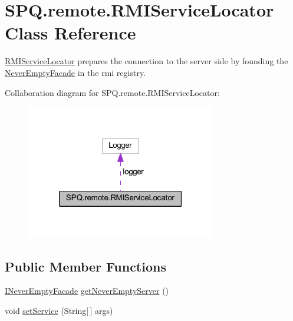 \hypertarget{class_s_p_q_1_1remote_1_1_r_m_i_service_locator}{}\section{S\+P\+Q.\+remote.\+R\+M\+I\+Service\+Locator Class Reference}
\label{class_s_p_q_1_1remote_1_1_r_m_i_service_locator}


\mbox{\hyperlink{class_s_p_q_1_1remote_1_1_r_m_i_service_locator}{R\+M\+I\+Service\+Locator}} prepares the connection to the server side by founding the \mbox{\hyperlink{class_s_p_q_1_1remote_1_1_never_empty_facade}{Never\+Empty\+Facade}} in the rmi registry.  




Collaboration diagram for S\+P\+Q.\+remote.\+R\+M\+I\+Service\+Locator\+:\nopagebreak
\begin{figure}[H]
\begin{center}
\leavevmode
\includegraphics[width=235pt]{class_s_p_q_1_1remote_1_1_r_m_i_service_locator__coll__graph}
\end{center}
\end{figure}
\subsection*{Public Member Functions}
\begin{DoxyCompactItemize}
\item 
\mbox{\hyperlink{interface_s_p_q_1_1remote_1_1_i_never_empty_facade}{I\+Never\+Empty\+Facade}} \mbox{\hyperlink{class_s_p_q_1_1remote_1_1_r_m_i_service_locator_a19d79d8b31c278a127bf921895d889ae}{get\+Never\+Empty\+Server}} ()
\item 
void \mbox{\hyperlink{class_s_p_q_1_1remote_1_1_r_m_i_service_locator_ae4d529073f4b435fa3d0fedcaad0fc70}{set\+Service}} (String\mbox{[}$\,$\mbox{]} args)
\end{DoxyCompactItemize}


